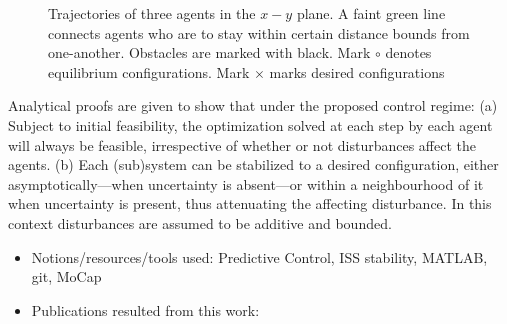 \begin{figure}[H]\centering
  \scalebox{0.8}{}
  \caption{\small Trajectories of three agents in the $x-y$ plane. A faint
           green line connects agents who are to stay within certain distance
           bounds from one-another. Obstacles are marked with black. Mark
           $\circ$ denotes equilibrium configurations. Mark $\times$ marks
           desired configurations}
  \label{fig:d_OFF_res_trajectory_3_2}
\end{figure}

Analytical proofs are given to show that under the proposed control regime: (a)
Subject to initial feasibility, the optimization solved at each step by each
agent will always be feasible, irrespective of whether or not disturbances
affect the agents. (b) Each (sub)system can be stabilized to a desired
configuration, either asymptotically---when uncertainty is absent---or within a
neighbourhood of it when uncertainty is present, thus attenuating the
affecting disturbance. In this context disturbances are assumed to be additive
and bounded.

\begin{itemize}
\item Notions/resources/tools used: Predictive Control, ISS stability, MATLAB, git, MoCap
\item Publications resulted from this work: \cite{Filotheou2018,Filotheou2020}
\end{itemize}
